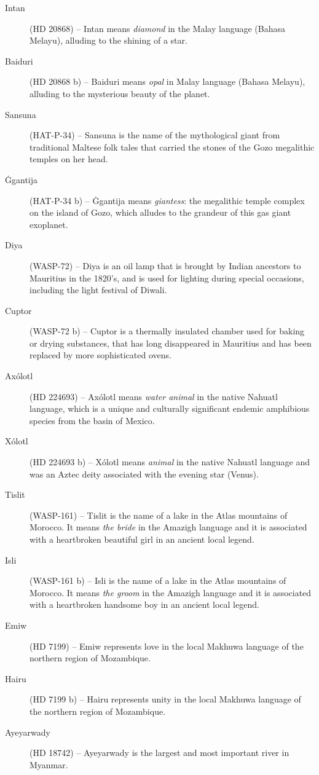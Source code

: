\begin{description}
\item[Intan] (HD 20868) -- Intan means \textit{diamond} in the Malay language (Bahasa Melayu), alluding to the shining of a star.
\item[Baiduri] (HD 20868 b) -- Baiduri means \textit{opal} in Malay language (Bahasa Melayu), alluding to the mysterious beauty of the planet.
\item[Sansuna] (HAT-P-34) -- Sansuna is the name of the mythological giant from traditional Maltese folk tales that carried the stones of the Gozo megalithic temples on her head.
\item[Ġgantija] (HAT-P-34 b) -- Ġgantija means \textit{giantess}: the megalithic temple complex on the island of Gozo, which alludes to the grandeur of this gas giant exoplanet.
\item[Diya] (WASP-72) -- Diya is an oil lamp that is brought by Indian ancestors to Mauritius in the 1820's, and is used for lighting during special occasions, including the light festival of Diwali.
\item[Cuptor] (WASP-72 b) -- Cuptor is a thermally insulated chamber used for baking or drying substances, that has long disappeared in Mauritius and has been replaced by more sophisticated ovens.
\item[Axólotl] (HD 224693) -- Axólotl means \textit{water animal} in the native Nahuatl language, which is a unique and culturally significant endemic amphibious species from the basin of Mexico.
\item[Xólotl] (HD 224693 b) -- Xólotl means \textit{animal} in the native Nahuatl language and was an Aztec deity associated with the evening star (Venus).
\item[Tislit] (WASP-161) -- Tislit is the name of a lake in the Atlas mountains of Morocco. It means \textit{the bride} in the Amazigh language and it is associated with a heartbroken beautiful girl in an ancient local legend.
\item[Isli] (WASP-161 b) -- Isli is the name of a lake in the Atlas mountains of Morocco. It means \textit{the groom} in the Amazigh language and it is associated with a heartbroken handsome boy in an ancient local legend.
\item[Emiw] (HD 7199) -- Emiw represents love in the local Makhuwa language of the northern region of Mozambique.
\item[Hairu] (HD 7199 b) -- Hairu represents unity in the local Makhuwa language of the northern region of Mozambique.
\item[Ayeyarwady] (HD 18742) -- Ayeyarwady is the largest and most important river in Myanmar.

\end{description}
